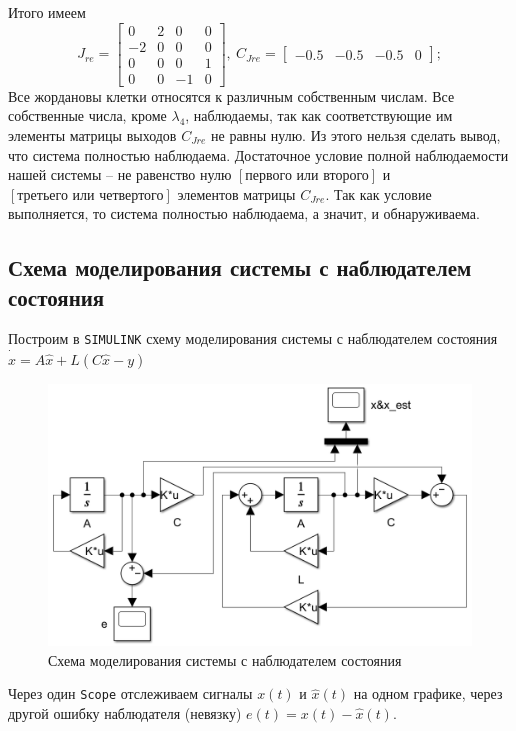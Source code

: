 \documentclass[a4paper, 12pt]{article}
\begin{document}
    Итого имеем
    $$
    J_{re}=\begin{bmatrix}
        0    &2   &0    &0\\
       -2   &0    &0   &0\\
        0   &0    &0    &1\\
       0   &0   &-1   &0
    \end{bmatrix},\ C_{Jre}=\begin{bmatrix}
        -0.5   &-0.5   &-0.5         &0
    \end{bmatrix};
    $$
    Все жордановы клетки относятся к различным собственным числам. Все собственные числа, кроме
    $\lambda_4$, наблюдаемы, так как соответствующие им элементы матрицы выходов $C_{Jre}$
    не равны нулю. Из этого нельзя сделать вывод, что система полностью наблюдаема. Достаточное
    условие полной наблюдаемости нашей системы -- не равенство нулю $\left[\text{первого или второго}\right]$
    и $\left[\text{третьего или четвертого}\right]$ элементов матрицы $C_{Jre}$. Так как условие
    выполняется, то система полностью наблюдаема, а значит, и обнаруживаема.


    \subsection{Схема моделирования системы с наблюдателем состояния}
    Построим в \texttt{SIMULINK} схему моделирования системы с наблюдателем состояния
    $\dot{\hat{x}}=A\hat{x}+L\left(C\hat{x}-y\right)$
    \begin{figure}[H]
        \centering
        \includegraphics[scale=0.45]{scheme_task2.png}
        \captionsetup{skip=0pt}
        \caption{Схема моделирования системы с наблюдателем состояния}
        \label{fig:scheme_task2}
    \end{figure}
    \noindent Через один \texttt{Scope} отслеживаем сигналы $x(t)\text{ и }\hat{x}(t)$ на одном графике,
    через другой ошибку наблюдателя (невязку) $e(t)=x(t)-\hat{x}(t)$.
\end{document}
